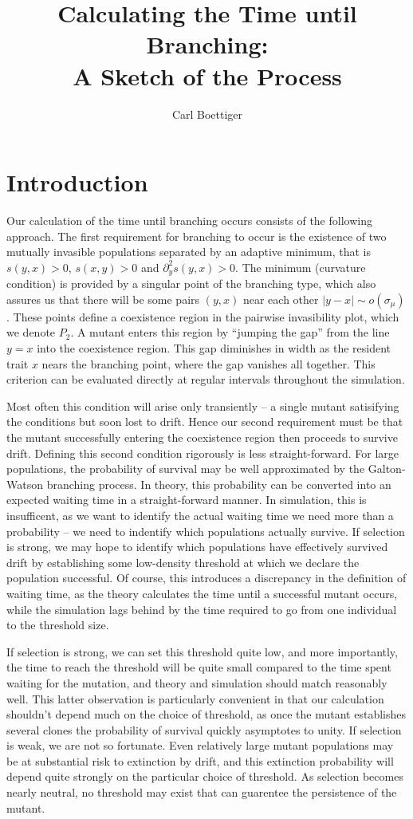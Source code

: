 \documentclass[letterpaper,10pt]{article}
\title{Calculating the Time until Branching:\\ A Sketch of the Process}
\author{Carl Boettiger}
\begin{document}
\maketitle
\section{Introduction}
Our calculation of the time until branching occurs consists of the following approach.  The first requirement for branching to occur is the existence of two mutually invasible populations separated by an adaptive minimum, that is $s(y,x) >0$, $s(x,y)>0$ and $\partial^2_y s(y,x)>0$.  The minimum (curvature condition) is provided by a singular point of the branching type, which also assures us that there will be some pairs $(y,x)$ near each other $|y-x| \sim o(\sigma_{\mu})$.  These points define a coexistence region in the pairwise invasibility plot, which we denote $P_2$.  A mutant enters this region by ``jumping the gap'' from the line $y=x$ into the coexistence region.  This gap diminishes in width as the resident trait $x$ nears the branching point, where the gap vanishes all together.   This criterion can be evaluated directly at regular intervals throughout the simulation.  

Most often this condition will arise only transiently -- a single mutant satisifying the conditions but soon lost to drift.  Hence our second requirement must be that the mutant successfully entering the coexistence region then proceeds to survive drift.  Defining this second condition rigorously is less straight-forward.  For large populations, the probability of survival may be well approximated by the Galton-Watson branching process.  In theory, this probability can be converted into an expected waiting time in a straight-forward manner.  In simulation, this is insufficent, as we want to identify the actual waiting time we need more than a probability -- we need to indentify which populations actually survive.  If selection is strong, we may hope to identify which populations have effectively survived drift by establishing some low-density threshold at which we declare the population successful.  Of course, this introduces a discrepancy in the definition of waiting time, as the theory calculates the time until a successful mutant occurs, while the simulation lags behind by the time required to go from one individual to the threshold size.  

If selection is strong, we can set this threshold quite low, and more importantly, the time to reach the threshold will be quite small compared to the time spent waiting for the mutation, and theory and simulation should match reasonably well.  This latter observation is particularly convenient in that our calculation shouldn't depend much on the choice of threshold, as once the mutant establishes several clones the probability of survival quickly asymptotes to unity.  If selection is weak, we are not so fortunate.  Even relatively large mutant populations may be at substantial risk to extinction by drift, and this extinction probability will depend quite strongly on the particular choice of threshold.  As selection becomes nearly neutral, no threshold may exist that can guarentee the persistence of the mutant.  
\end{document}
